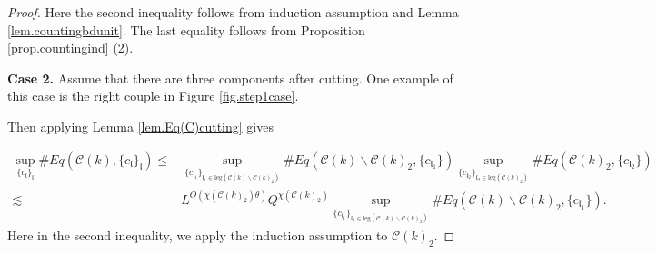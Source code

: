 \begin{proof}
Here the second inequality follows from induction assumption and Lemma \ref{lem.countingbdunit}. The last equality follows from Proposition \ref{prop.countingind} (2).


\textbf{Case 2.} Assume that there are three components after cutting. One example of this case is the right couple in Figure \ref{fig.step1case}.

Then applying Lemma \ref{lem.Eq(C)cutting} gives

\begin{equation}\label{eq.case2expand.threewave}
\begin{split}
    \sup_{\{c_{\mathfrak{l}}\}_{\mathfrak{l}}}\#Eq(\mathcal{C}(k),\{c_{\mathfrak{l}}\}_{\mathfrak{l}})\le&
    \sup_{\{c_{\mathfrak{l}_1}\}_{\mathfrak{l}_1\in \text{leg}(\mathcal{C}(k)\backslash\mathcal{C}(k)_2)} } \# Eq(\mathcal{C}(k)\backslash\mathcal{C}(k)_2,\{c_{\mathfrak{l}_1}\}) \sup_{\{c_{\mathfrak{l}_2}\}_{\mathfrak{l}_2\in \text{leg}(\mathcal{C}(k)_2)} }\# Eq(\mathcal{C}(k)_2, \{c_{\mathfrak{l}_2}\})
    \\
    \lesssim&  L^{O(\chi(\mathcal{C}(k)_2)\theta)} Q^{\chi(\mathcal{C}(k)_2)}\sup_{\{c_{\mathfrak{l}_1}\}_{\mathfrak{l}_1\in \text{leg}(\mathcal{C}(k)\backslash\mathcal{C}(k)_2)} } \# Eq(\mathcal{C}(k)\backslash\mathcal{C}(k)_2,\{c_{\mathfrak{l}_1}\}).
\end{split}
\end{equation}
Here in the second inequality, we apply the induction assumption to $\mathcal{C}(k)_2$.


\end{proof}
